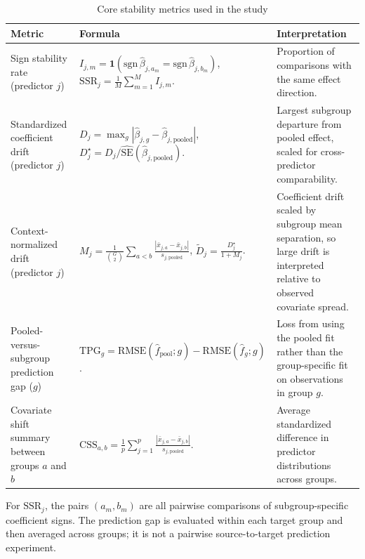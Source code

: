\begin{table}[htbp]
\centering
\small
\setlength{\tabcolsep}{5pt}
\renewcommand{\arraystretch}{1.3}
\caption{Core stability metrics used in the study}
\label{tab:core-metrics}
\begin{tabularx}{\textwidth}{>{\raggedright\arraybackslash}p{} >{\raggedright\arraybackslash}X >{\raggedright\arraybackslash}X}
\toprule
\textbf{Metric} & \textbf{Formula} & \textbf{Interpretation} \\
\midrule
Sign stability rate (predictor $j$)
&
$I_{j,m}=\mathbf{1}(\mathrm{sgn}\,\hat{\beta}_{j,a_m}=\mathrm{sgn}\,\hat{\beta}_{j,b_m})$,\; $\mathrm{SSR}_j=\frac{1}{M}\sum_{m=1}^{M} I_{j,m}$.
&
Proportion of comparisons with the same effect direction. \\[10pt]

Standardized coefficient drift (predictor $j$)
&
$D_j = \max_g \left|\hat{\beta}_{j,g} - \hat{\beta}_{j,\mathrm{pooled}}\right|$, \; $D_j^{\star} = D_j / \widehat{\mathrm{SE}}\!\left(\hat{\beta}_{j,\mathrm{pooled}}\right)$.
&
Largest subgroup departure from pooled effect, scaled for cross-predictor comparability. \\[10pt]

Context-normalized drift (predictor $j$)
&
$M_j = \frac{1}{\binom{G}{2}}\sum_{a<b} \frac{|\bar{x}_{j,a} - \bar{x}_{j,b}|}{s_{j,\mathrm{pooled}}}$, \;
$\widetilde{D}_j = \frac{D_j^{\star}}{1 + M_j}$.
&
Coefficient drift scaled by subgroup mean separation, so large drift is interpreted relative to observed covariate spread. \\[10pt]

Pooled-versus-subgroup prediction gap ($g$)
&
$\mathrm{TPG}_g = \mathrm{RMSE}(\hat f_{\mathrm{pool}};g) - \mathrm{RMSE}(\hat f_g;g)$.
&
Loss from using the pooled fit rather than the group-specific fit on observations in group $g$. \\[10pt]

Covariate shift summary between groups $a$ and $b$
&
$\mathrm{CSS}_{a,b} = \frac{1}{p} \sum_{j=1}^{p} \frac{\left|\bar{x}_{j,a} - \bar{x}_{j,b}\right|}{s_{j,\mathrm{pooled}}}$.
&
Average standardized difference in predictor distributions across groups. \\
\bottomrule
\end{tabularx}
\end{table}

For $\mathrm{SSR}_j$, the pairs $(a_m,b_m)$ are all pairwise comparisons of subgroup-specific coefficient signs. The prediction gap is evaluated within each target group and then averaged across groups; it is not a pairwise source-to-target prediction experiment.

